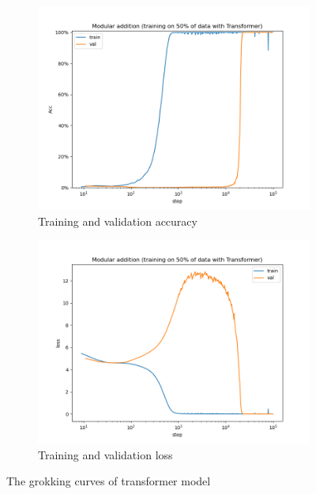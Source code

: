 \begin{figure}[!ht]
    \centering
    \begin{subfigure}{0.45\textwidth}
        \centering
        \includegraphics[width=\linewidth]{fig/grokking_curves/addition_50_Transformer_step.png}
        \caption{Training and validation accuracy}
        \label{fig:grokking_curve_transformer}
    \end{subfigure}
    \begin{subfigure}{0.45\textwidth}
        \centering
        \includegraphics[width=\linewidth]{fig/loss_curves/addition_50_Transformer_step.png}
        \caption{Training and validation loss}
        \label{fig:loss_curve_transformer}
    \end{subfigure}

    \caption{The grokking curves of transformer model}
    \label{fig:acc_and_loss_transformer}
\end{figure}

